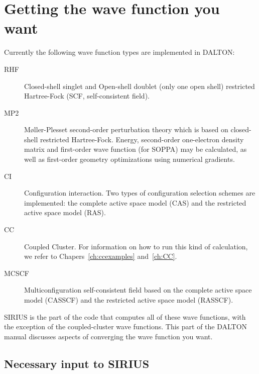 \chapter{\label{ch:wf-guide}Getting the wave function you want}

Currently the following wave function types are implemented in DALTON:

\begin{description}

\item[RHF] Closed-shell singlet and Open-shell doublet (only one open shell)
restricted Hartree-Fock (SCF, self-consistent
field).

\item[MP2] M{\o}ller-Plesset second-order perturbation
theory which is based on
closed-shell
restricted Hartree-Fock.  Energy, second-order one-electron
density matrix and first-order wave function (for SOPPA) may be
calculated, as well as first-order geometry optimizations using
numerical gradients. 

\item[CI] Configuration interaction. Two types of configuration selection
schemes are implemented: the complete active space model (CAS) and the
restricted active space model (RAS).

\item[CC] Coupled Cluster.
For information on how to run this kind of calculation, we refer to 
Chapers~\ref{ch:ccexamples} and~\ref{ch:CC}.

\item[MCSCF] Multiconfiguration self-consistent field based on
the complete active space model (CASSCF) and
the restricted active space model
(RASSCF).

\end{description}

SIRIUS is the part of the code that computes all of these
wave functions, with the exception of the coupled-cluster wave functions.
This part of the DALTON manual discusses aspects of converging the
wave function you want.

\section{\label{sec:ig_necinp} Necessary input to SIRIUS}

